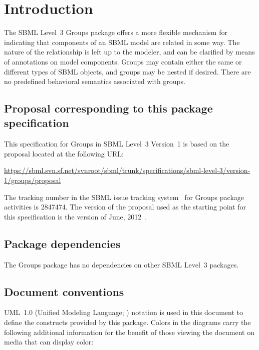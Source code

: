 
\section{Introduction}
\label{intro}

The SBML Level~3 Groups package offers a more flexible mechanism for indicating that components of an SBML model are related in some way.  The nature of the relationship is left up to the modeler, and can be clarified by means of annotations on model components.  Groups may contain either the same or different types of SBML objects, and groups may be nested if desired.  There are no predefined behavioral semantics associated with groups.


\subsection{Proposal corresponding to this package specification}

This specification for Groups in SBML Level~3 Version~1 is based on the proposal located at the following URL:

\begin{center}
  \vspace*{1ex}\small
  \url{https://sbml.svn.sf.net/svnroot/sbml/trunk/specifications/sbml-level-3/version-1/groups/proposal}
  \vspace*{1ex}
\end{center}

The tracking number in the SBML issue tracking system~\citep{tracker} for Groups package activities is 2847474.  The version of the proposal used as the starting point for this specification is the version of June, 2012~\citep{hucka_2012}.


\subsection{Package dependencies}

The Groups package has no dependencies on other SBML Level~3 packages.


\subsection{Document conventions}
\label{conventions}

UML~1.0 (Unified Modeling Language; \citealt{eriksson:1998, oestereich:1999}) notation is used in this document to define the constructs provided by this package.  Colors in the diagrams carry the following additional information for the benefit of those viewing the document on media that can display color:

